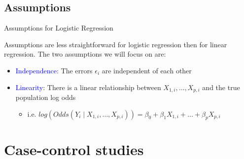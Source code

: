 \documentclass[10pt,t]{beamer}
\begin{document}
%

\subsection{Assumptions}

\begin{frame}{Assumptions for Logistic Regression}
	
	Assumptions are less straightforward for logistic regression then for linear regression. The two assumptions we will focus on are:
	
	\medskip
	
	\begin{itemize}
		
			\item \textcolor{blue}{Independence}: The errors $\epsilon_i$ are independent of each other
			
		
		\medskip
		
	\item \textcolor{blue}{Linearity}: There is a linear relationship between $X_{1,i}, \dots, X_{p,i}$ \color{black} and the true population log odds
	\begin{itemize}
		\item i.e. \color{blue} $log(Odds(Y_i \mid X_{1,i}, \dots, X_{p,i})) = \beta_0 + \beta_1 X_{1,i} + \dots + \beta_p X_{p,i}$  \color{black}
	\end{itemize} 

		
		\end{itemize}
	
	
	
\end{frame}

\begin{frame}
	
\end{frame}

\section{Case-control studies}
\end{document}

